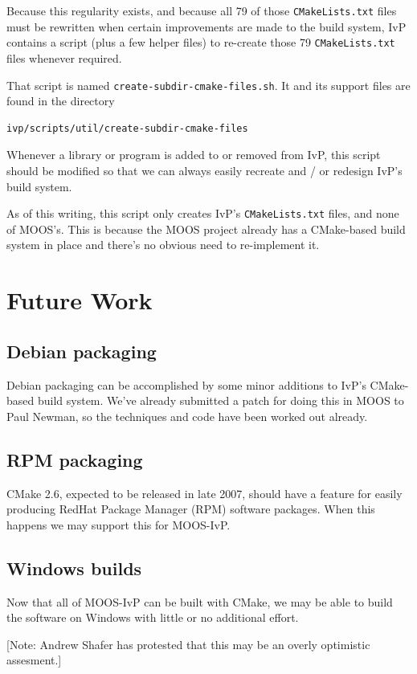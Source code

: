 \documentclass[letterpaper,10pt]{article}
\begin{document}
Because this regularity exists, and because all 79 of those \verb|CMakeLists.txt| files must
be rewritten when certain improvements are made to the build system, IvP contains a
script (plus a few helper files) to re-create those 79 \verb|CMakeLists.txt| files 
whenever required.

That script is named \verb|create-subdir-cmake-files.sh|.  It and its support files are 
found in the directory
\begin{verbatim}
ivp/scripts/util/create-subdir-cmake-files 
\end{verbatim} 

Whenever a library or program is added to or removed from IvP, this script should be
modified so that we can always easily recreate and / or redesign IvP's build system.

As of this writing, this script only creates IvP's \verb|CMakeLists.txt| files, and none
of MOOS's.  This is because the MOOS project already has a CMake-based build system in 
place and there's no obvious need to re-implement it.


\section{Future Work}


\subsection{Debian packaging}
Debian packaging can be accomplished by some minor additions to IvP's 
CMake-based build system.  We've already submitted a patch for doing this
in MOOS to Paul Newman, so the techniques and code have been worked out
already.

\subsection{RPM packaging}
CMake 2.6, expected to be released in late 2007, should have a feature for
easily producing RedHat Package Manager (RPM) software packages.  When this
happens we may support this for MOOS-IvP.

\subsection{Windows builds}
Now that all of MOOS-IvP can be built with CMake, we may be able to build
the software on Windows with little or no additional effort.

[Note: Andrew Shafer has protested that this may be an overly optimistic
assesment.]
\end{document}
